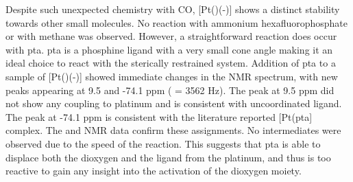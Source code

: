 Despite such unexpected chemistry with CO, [Pt(\tButhixantphos)(\hapto{}-)] shows a distinct stability towards other small molecules.  No reaction with ammonium hexafluorophosphate or with methane was observed.  However, a straightforward reaction does occur with \gls{pta}.  \Gls{pta} is a phosphine ligand with a very small cone angle making it an ideal choice to react with the sterically restrained system.\cite{Phillips2004}  Addition of \gls{pta} to a sample of [Pt(\tButhixantphos)(\hapto{}-)] showed immediate changes in the \phosphorus{} NMR spectrum, with new peaks appearing at 9.5 and -74.1 ppm (\JPtP{} = 3562 Hz).  The peak at 9.5 ppm did not show any coupling to platinum and is consistent with uncoordinated \tButhixantphos{} ligand.  The peak at -74.1 ppm is consistent with the literature reported [Pt(\gls{pta}] complex.  The \proton{} and \carbon{} NMR data confirm these assignments.  No intermediates were observed due to the speed of the reaction.  This suggests that \gls{pta} is able to displace both the dioxygen and the \tButhixantphos{} ligand from the platinum, and thus is too reactive to gain any insight into the activation of the dioxygen moiety.  
%
%
%
%
%  
